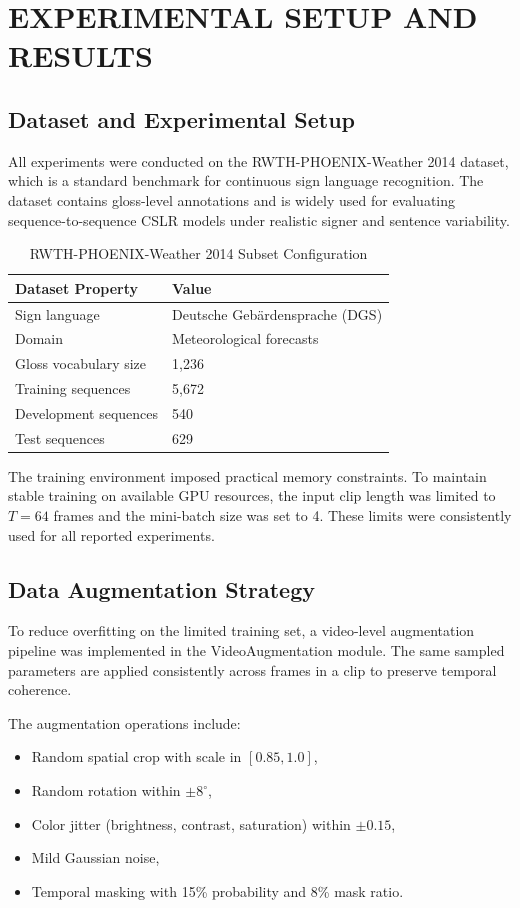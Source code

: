 \chapter{EXPERIMENTAL SETUP AND RESULTS}

\section{Dataset and Experimental Setup}

All experiments were conducted on the RWTH-PHOENIX-Weather 2014 dataset, which is a standard benchmark for continuous sign language recognition. The dataset contains gloss-level annotations and is widely used for evaluating sequence-to-sequence CSLR models under realistic signer and sentence variability.

\begin{table}[H]
\centering
\caption{RWTH-PHOENIX-Weather 2014 Subset Configuration}
\label{tab:dataset_phoenix}
\begin{tabular}{@{}ll@{}}
\toprule
\textbf{Dataset Property} & \textbf{Value} \\
\midrule
Sign language & Deutsche Gebärdensprache (DGS) \\
Domain & Meteorological forecasts \\
Gloss vocabulary size & 1,236 \\
Training sequences & 5,672 \\
Development sequences & 540 \\
Test sequences & 629 \\
\bottomrule
\end{tabular}
\end{table}

The training environment imposed practical memory constraints. To maintain stable training on available GPU resources, the input clip length was limited to $T=64$ frames and the mini-batch size was set to 4. These limits were consistently used for all reported experiments.

\section{Data Augmentation Strategy}

To reduce overfitting on the limited training set, a video-level augmentation pipeline was implemented in the VideoAugmentation module. The same sampled parameters are applied consistently across frames in a clip to preserve temporal coherence.

The augmentation operations include:
\begin{itemize}
    \item Random spatial crop with scale in $[0.85, 1.0]$,
    \item Random rotation within $\pm 8^\circ$,
    \item Color jitter (brightness, contrast, saturation) within $\pm 0.15$,
    \item Mild Gaussian noise,
    \item Temporal masking with 15\% probability and 8\% mask ratio.
\end{itemize}

